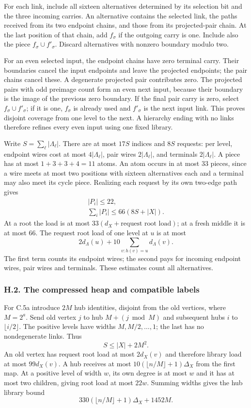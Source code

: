 \documentclass[english,11pt,a4paper]{article}
\begin{document}
For each link, include all sixteen alternatives determined by its selection bit and the three incoming carries. An alternative contains the selected link, the paths received from its two endpoint chains, and those from its projected-pair chain. At the last position of that chain, add \(f_\sigma\) if the outgoing carry is one. Include also the piece \(f_\sigma\cup f'_\sigma\). Discard alternatives with nonzero boundary modulo two.

For an even selected input, the endpoint chains have zero terminal carry. Their boundaries cancel the input endpoints and leave the projected endpoints; the pair chains cancel these. A degenerate projected pair contributes zero. The projected pairs with odd preimage count form an even next input, because their boundary is the image of the previous zero boundary. If the final pair carry is zero, select \(f_\sigma\cup f'_\sigma\); if it is one, \(f_\sigma\) is already used and \(f'_\sigma\) is the next input link. This proves disjoint coverage from one level to the next. A hierarchy ending with no links therefore refines every even input using one fixed library.

Write \(S=\sum_\ell|\Lambda_\ell|\). There are at most \(17S\) indices and \(8S\) requests: per level, endpoint wires cost at most \(4|\Lambda_\ell|\), pair wires \(2|\Lambda_\ell|\), and terminals \(2|\Lambda_\ell|\). A piece has at most \(1+3+3+4=11\) atoms. An atom occurs in at most \(33\) pieces, since a wire meets at most two positions with sixteen alternatives each and a terminal may also meet its cycle piece. Realizing each request by its own two-edge path gives \[\begin{gathered}
|P_i|\le22,\\
\sum_i|P_i|\le66(8S+|X|).
\end{gathered}\] At a root the load is at most \(33(d_X+\text{request root load})\); at a fresh middle it is at most \(66\). The request root load of one level at \(u\) is at most \[2d_\Lambda(u)+10\sum_{v:h(v)=u}d_\Lambda(v).\] The first term counts its endpoint wires; the second pays for incoming endpoint wires, pair wires and terminals. These estimates count all alternatives.

\subsubsection{H.2. The compressed heap and compatible labels}\label{h.2.-the-compressed-heap-and-compatible-labels}

For C.5a introduce \(2M\) hub identities, disjoint from the old vertices, where \(M=2^a\). Send old vertex \(j\) to hub \(M+(j\bmod M)\) and subsequent hubs \(i\) to \(\lfloor i/2\rfloor\). The positive levels have widths \(M,M/2,\ldots,1\); the last has no nondegenerate links. Thus \[S\le|X|+2M^2.\] An old vertex has request root load at most \(2d_X(v)\) and therefore library load at most \(99d_X(v)\). A hub receives at most \(10(\lfloor n/M\rfloor+1)\Delta_X\) from the first map. At a positive level of width \(w\), its own degree is at most \(w\) and it has at most two children, giving root load at most \(22w\). Summing widths gives the hub library bound \[330(\lfloor n/M\rfloor+1)\Delta_X+1452M.\]
\end{document}

